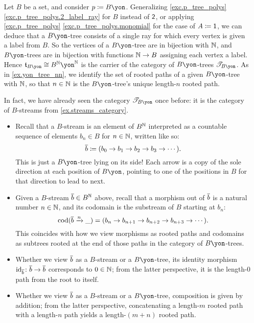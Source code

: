 \documentclass[Book-Poly]{subfiles}
\begin{document}
\begin{example}\label{ex.streams_cofree}
Let $B$ be a set, and consider $p\coloneqq B\yon$.
Generalizing \cref{exc.p_tree_polys} \cref{exc.p_tree_polys.2_label_ray} for $B$ instead of $\textsf{2}$, or applying \cref{exc.p_tree_polys} \cref{exc.p_tree_polys.monomial} for the case of $A\coloneqq\textsf{1}$, we can deduce that a $B\yon$-tree consists of a single ray for which every vertex is given a label from $B$.
So the vertices of a $B\yon$-tree are in bijection with $\mathbb{N}$, and $B\yon$-trees are in bijection with functions $\mathbb{N}\to B$ assigning each vertex a label.
Hence $\car{t}_{B\yon}\iso B^\nn\yon^\nn$ is the carrier of the category of $B\yon$-trees $\cofree{B\yon}$.
As in \cref{ex.yon_tree_nn}, we identify the set of rooted paths of a given $B\yon$-tree with $\mathbb{N}$, so that $n\in\mathbb{N}$ is the $B\yon$-tree's unique length-$n$ rooted path.

In fact, we have already seen the category $\cofree{B\yon}$ once before: it is the category of $B$-streams from \cref{ex.streams_category}.

\begin{itemize}
    \item Recall that a $B$-stream is an element of $B^{\mathbb{N}}$ interpreted as a countable sequence of elements $b_n\in B$ for $n\in\mathbb{N}$, written like so:
    \[
        \overline{b}\coloneqq(b_0\to b_1\to b_2\to b_3\to\cdots).
    \]
    This is just a $B\yon$-tree lying on its side!
    Each arrow is a copy of the sole direction at each position of $B\yon$, pointing to one of the positions in $B$ for that direction to lead to next.
    \item Given a $B$-stream $\overline{b}\in B^{\mathbb{N}}$ above, recall that a morphism out of $\overline{b}$ is a natural number $n\in\mathbb{N}$, and its codomain is the substream of $B$ starting at $b_n$:
    \[
        \operatorname{cod}(\overline{b}\xrightarrow{n}\_)=(b_n\to b_{n+1}\to b_{n+2}\to b_{n+3}\to\cdots).
    \]
    This coincides with how we view morphisms as rooted paths and codomains as subtrees rooted at the end of those paths in the category of $B\yon$-trees.
    \item Whether we view $\overline{b}$ as a $B$-stream or a $B\yon$-tree, its identity morphism $\mathrm{id}_{\overline{b}}\colon\overline{b}\to\overline{b}$ corresponds to $0\in\mathbb{N}$; from the latter perspective, it is the length-$0$ path from the root to itself.
    \item Whether we view $\overline{b}$ as a $B$-stream or a $B\yon$-tree, composition is given by addition; from the latter perspective, concatenating a length-$m$ rooted path with a length-$n$ path yields a length-$(m+n)$ rooted path.
\end{itemize}
\end{example}
\end{document}
